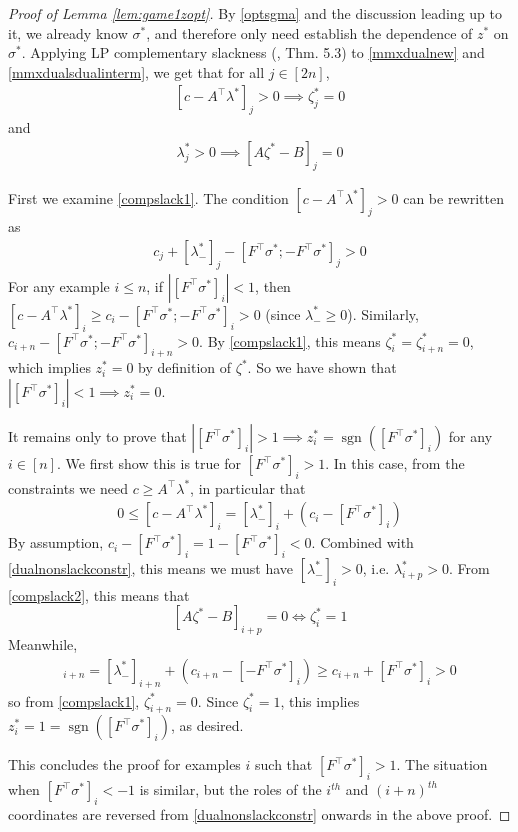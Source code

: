 \documentclass{colt2015} %
\DeclareMathOperator{\sgn}{sgn}
\newcommand{\abs}[1]{\left| #1 \right|}
\begin{document}
\begin{proof}[Proof of Lemma \ref{lem:game1zopt}]
By \eqref{optsgma} and the discussion leading up to it, we already know $\sigma^*$, 
and therefore only need establish the dependence of $z^*$ on $\sigma^*$.
Applying LP complementary slackness (\cite{V96}, Thm. 5.3) to \eqref{mmxdualnew} and \eqref{mmxdualsdualinterm}, 
we get that for all $j \in [2n]$,
\begin{align}
\label{compslack1}
[c - A^\top \lambda^*]_{j} > 0 \implies \zeta_{j}^* = 0
\end{align}
and
\begin{align}
\label{compslack2}
\lambda_{j}^* > 0 \implies [A \zeta^* - B]_{j} = 0
\end{align}

First we examine \eqref{compslack1}. 
The condition $[c - A^\top \lambda^*]_{j} > 0$ can be rewritten as 
\begin{align*}
c_j + [ \lambda_{-}^* ]_{j} - [F^\top \sigma^*; - F^\top \sigma^*]_{j} > 0
\end{align*}
For any example $i \leq n$, if $\abs{[F^\top \sigma^*]_i} < 1$, 
then $[c - A^\top \lambda^*]_{i} \geq c_{i} - [F^\top \sigma^*; - F^\top \sigma^*]_{i} > 0$ 
(since $\lambda_{-}^* \geq 0$).
Similarly, 
$c_{i+n} - [F^\top \sigma^*; - F^\top \sigma^*]_{i+n} > 0$. 
By \eqref{compslack1}, this means $\zeta_{i}^* = \zeta_{i+n}^* = 0$, 
which implies $z_{i}^* = 0$ by definition of $\zeta^*$. 
So we have shown that 
$\abs{[F^\top \sigma^*]_i} < 1 \implies z_{i}^* = 0$. 

It remains only to prove that 
$\abs{[F^\top \sigma^*]_i} > 1 \implies z_{i}^* = \sgn([F^\top \sigma^*]_i)$ for any $i \in [n]$. 
We first show this is true for $[F^\top \sigma^*]_i > 1$.
In this case, from the constraints we need $c \geq A^\top \lambda^*$, 
in particular that 
\begin{align}
\label{dualnonslackconstr}
0 \leq [c - A^\top \lambda^*]_{i} = [ \lambda_{-}^* ]_{i} + (c_i - [F^\top \sigma^*]_{i})
\end{align}
By assumption, $c_i - [F^\top \sigma^*]_{i} = 1 - [F^\top \sigma^*]_{i} < 0$. 
Combined with \eqref{dualnonslackconstr}, 
this means we must have $[ \lambda_{-}^* ]_{i} > 0$, i.e. $\lambda_{i+p}^* > 0$. 
From \eqref{compslack2}, 
this means that 
$$[A \zeta^* - B]_{i+p} = 0 \iff \zeta_i^* = 1 $$
Meanwhile, 
\begin{align*}
[c - A^\top \lambda^*]_{i+n} = [ \lambda_{-}^* ]_{i+n} + (c_{i+n} - [- F^\top \sigma^*]_{i})
\geq c_{i+n} + [F^\top \sigma^*]_{i} > 0
\end{align*}
so from \eqref{compslack1}, $\zeta_{i+n}^* = 0$. 
Since $\zeta_i^* = 1$, this implies $z_i^* = 1 = \sgn([F^\top \sigma^*]_i)$, as desired.

This concludes the proof for examples $i$ such that $[F^\top \sigma^*]_i > 1$. 
The situation when $[F^\top \sigma^*]_i < -1$ is similar, 
but the roles of the $i^{th}$ and $(i+n)^{th}$ coordinates are reversed 
from \eqref{dualnonslackconstr} onwards in the above proof.
\end{proof}
\end{document}
